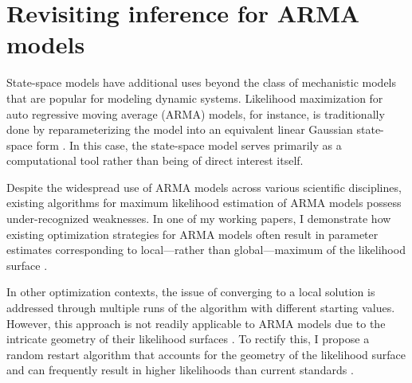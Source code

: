 \documentclass{article}
\begin{document}


\section{Revisiting inference for ARMA models}

State-space models have additional uses beyond the class of mechanistic models that are popular for modeling dynamic systems.
Likelihood maximization for auto regressive moving average (ARMA) models, for instance, is traditionally done by reparameterizing the model into an equivalent linear Gaussian state-space form \cite{gardner80, durbin12}.
In this case, the state-space model serves primarily as a computational tool rather than being of direct interest itself.

Despite the widespread use of ARMA models across various scientific disciplines, existing algorithms for maximum likelihood estimation of ARMA models possess under-recognized weaknesses.
In one of my working papers, I demonstrate how existing optimization strategies for ARMA models often result in parameter estimates corresponding to local---rather than global---maximum of the likelihood surface \cite{wheelerARMA}.

In other optimization contexts, the issue of converging to a local solution is addressed through multiple runs of the algorithm with different starting values.
However, this approach is not readily applicable to ARMA models due to the intricate geometry of their likelihood surfaces \cite{ripley2002}.
To rectify this, I propose a random restart algorithm that accounts for the geometry of the likelihood surface and can frequently result in higher likelihoods than current standards \cite{wheelerARMA}.
\end{document}
